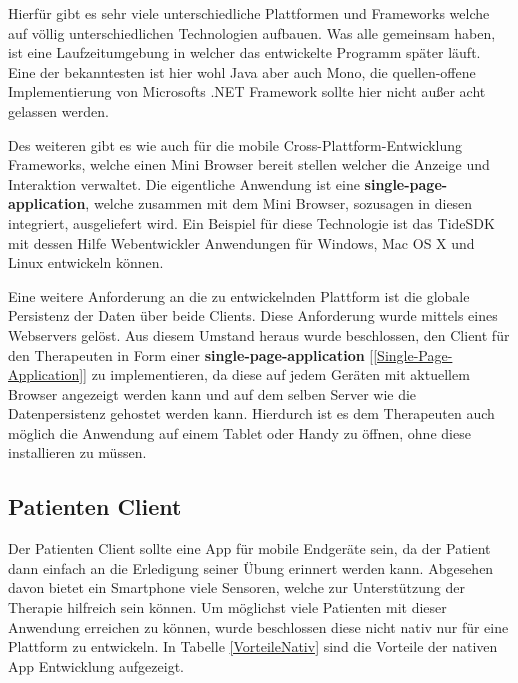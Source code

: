 Hierfür gibt es sehr viele unterschiedliche Plattformen und Frameworks welche auf völlig unterschiedlichen Technologien aufbauen. Was alle gemeinsam haben, ist eine Laufzeitumgebung in welcher das entwickelte Programm später läuft. Eine der bekanntesten ist hier wohl Java aber auch Mono, die quellen-offene Implementierung von Microsofts .NET Framework sollte hier nicht außer acht gelassen werden. 

Des weiteren gibt es wie auch für die mobile Cross-Plattform-Entwicklung Frameworks, welche einen Mini Browser bereit stellen welcher die Anzeige und Interaktion verwaltet. Die eigentliche Anwendung ist eine \textbf{single-page-application}, welche zusammen mit dem Mini Browser, sozusagen in diesen integriert, ausgeliefert wird. Ein Beispiel für diese Technologie ist das TideSDK mit dessen Hilfe Webentwickler Anwendungen für Windows, Mac OS X und Linux entwickeln können.

Eine weitere Anforderung an die zu entwickelnden Plattform ist die globale Persistenz der Daten über beide Clients. Diese Anforderung wurde mittels eines Webservers gelöst. Aus diesem Umstand heraus wurde beschlossen, den Client für den Therapeuten in Form einer \textbf{single-page-application} [\ref{Single-Page-Application}] zu implementieren, da diese auf jedem Geräten mit aktuellem Browser angezeigt werden kann und auf dem selben Server wie die Datenpersistenz gehostet werden kann.
Hierdurch ist es dem Therapeuten auch möglich die Anwendung auf einem Tablet oder Handy zu öffnen, ohne diese installieren zu müssen.

\subsection{Patienten Client}
Der Patienten Client sollte eine App für mobile Endgeräte sein, da der Patient dann einfach an die Erledigung  seiner Übung erinnert werden kann. Abgesehen davon bietet ein Smartphone viele Sensoren, welche zur Unterstützung der Therapie hilfreich sein können. Um möglichst viele Patienten mit dieser Anwendung erreichen zu können, wurde beschlossen diese nicht nativ nur für eine Plattform zu entwickeln. In Tabelle \ref{VorteileNativ} sind die Vorteile der nativen App Entwicklung aufgezeigt.

